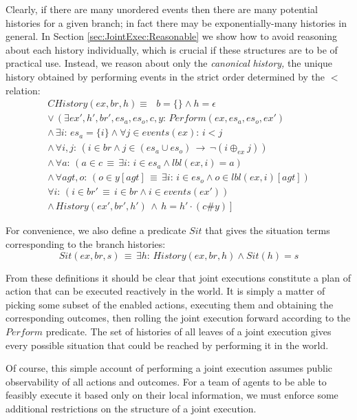 Clearly, if there are many unordered events then there are many potential
histories for a given branch; in fact there may be exponentially-many
histories in general. In Section \ref{sec:JointExec:Reasonable} we
show how to avoid reasoning about each history individually, which
is crucial if these structures are to be of practical use. Instead,
we reason about only the \emph{canonical} \emph{history,} the unique
history obtained by performing events in the strict order determined
by the $<$ relation:\begin{gather*}
CHistory(ex,br,h)\equiv\,\,\,\, b=\{\}\wedge h=\epsilon\\
\vee\,\left(\exists ex',h',br',es_{a},es_{o},c,y:\, Perform(ex,es_{a},es_{o},ex')\right.\\
\wedge\,\exists i:\, es_{a}=\{i\}\wedge\forall j\in events(ex):\, i<j\,\\
\wedge\,\forall i,j:\,\left(i\in br\wedge j\in(es_{a}\cup es_{o})\,\rightarrow\,\neg(i\oplus_{ex}j)\right)\\
\wedge\,\forall a:\,\left(a\in c\,\equiv\,\exists i:\, i\in es_{a}\wedge lbl(ex,i)=a\right)\\
\wedge\,\forall agt,o:\,\left(o\in y[agt]\,\equiv\,\exists i:\, i\in es_{o}\wedge o\in lbl(ex,i)[agt]\right)\\
\forall i:\,\left(i\in br'\,\equiv\, i\in br\wedge i\in events(ex')\right)\\
\left.\wedge\, History(ex',br',h')\,\wedge\, h=h'\cdot(c\#y)\right]\end{gather*}


For convenience, we also define a predicate $Sit$ that gives the
situation terms corresponding to the branch histories:\[
Sit(ex,br,s)\,\equiv\,\exists h:\, History(ex,br,h)\wedge Sit(h)=s\]


From these definitions it should be clear that joint executions constitute
a plan of action that can be executed reactively in the world. It
is simply a matter of picking some subset of the enabled actions,
executing them and obtaining the corresponding outcomes, then rolling
the joint execution forward according to the $Perform$ predicate.
The set of histories of all leaves of a joint execution gives every
possible situation that could be reached by performing it in the world.

Of course, this simple account of performing a joint execution assumes
public observability of all actions and outcomes. For a team of agents
to be able to feasibly execute it based only on their local information,
we must enforce some additional restrictions on the structure of a
joint execution.


